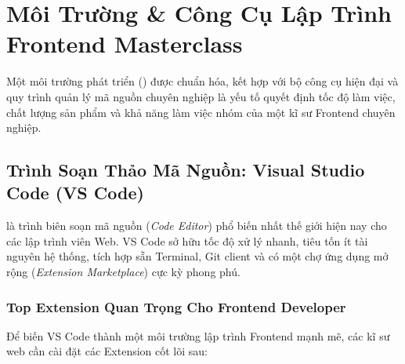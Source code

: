 \chapter{Môi Trường \& Công Cụ Lập Trình Frontend Masterclass}
\label{chap:dev_environment}

Một môi trường phát triển () được chuẩn hóa, kết hợp với bộ công cụ hiện đại và quy trình quản lý mã nguồn chuyên nghiệp là yếu tố quyết định tốc độ làm việc, chất lượng sản phẩm và khả năng làm việc nhóm của một kĩ sư Frontend chuyên nghiệp.

\section{Trình Soạn Thảo Mã Nguồn: Visual Studio Code (VS Code)}

 là trình biên soạn mã nguồn (\textit{Code Editor}) phổ biến nhất thế giới hiện nay cho các lập trình viên Web. VS Code sở hữu tốc độ xử lý nhanh, tiêu tốn ít tài nguyên hệ thống, tích hợp sẵn Terminal, Git client và có một chợ ứng dụng mở rộng (\textit{Extension Marketplace}) cực kỳ phong phú.

\subsection{Top Extension Quan Trọng Cho Frontend Developer}

Để biến VS Code thành một môi trường lập trình Frontend mạnh mẽ, các kĩ sư web cần cài đặt các Extension cốt lõi sau:

